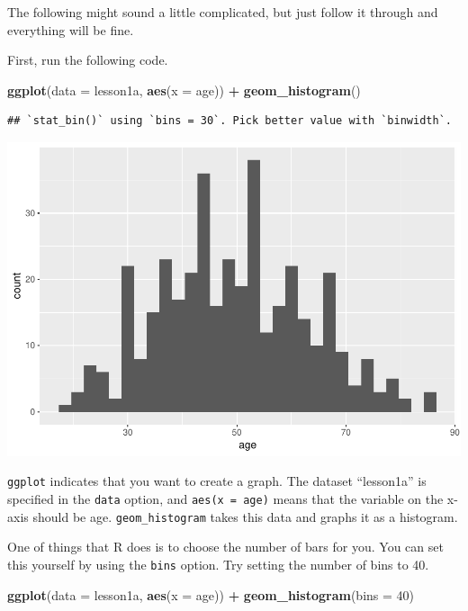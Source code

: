 \documentclass[]{book}
\newenvironment{Shaded}{\begin{snugshade}}{\end{snugshade}}
\newcommand{\DataTypeTok}[1]{\textcolor[rgb]{0.13,0.29,0.53}{#1}}
\newcommand{\DecValTok}[1]{\textcolor[rgb]{0.00,0.00,0.81}{#1}}
\newcommand{\KeywordTok}[1]{\textcolor[rgb]{0.13,0.29,0.53}{\textbf{#1}}}
\newcommand{\NormalTok}[1]{#1}
\newcommand{\OperatorTok}[1]{\textcolor[rgb]{0.81,0.36,0.00}{\textbf{#1}}}
\newcommand{\StringTok}[1]{\textcolor[rgb]{0.31,0.60,0.02}{#1}}
\begin{document}
The following might sound a little complicated, but just follow it
through and everything will be fine.

First, run the following code.

\begin{Shaded}
\begin{Highlighting}[]
\KeywordTok{ggplot}\NormalTok{(}\DataTypeTok{data =}\NormalTok{ lesson1a,}
       \KeywordTok{aes}\NormalTok{(}\DataTypeTok{x =}\NormalTok{ age)) }\OperatorTok{+}
\StringTok{  }\KeywordTok{geom_histogram}\NormalTok{()}
\end{Highlighting}
\end{Shaded}

\begin{verbatim}
## `stat_bin()` using `bins = 30`. Pick better value with `binwidth`.
\end{verbatim}

\includegraphics{02-week2_files/figure-latex/section2m-1.pdf}

\texttt{ggplot} indicates that you want to create a graph. The dataset
``lesson1a'' is specified in the \texttt{data} option, and
\texttt{aes(x\ =\ age)} means that the variable on the x-axis should be
age. \texttt{geom\_histogram} takes this data and graphs it as a
histogram.

One of things that R does is to choose the number of bars for you. You
can set this yourself by using the \texttt{bins} option. Try setting the
number of bins to 40.

\begin{Shaded}
\begin{Highlighting}[]
\KeywordTok{ggplot}\NormalTok{(}\DataTypeTok{data =}\NormalTok{ lesson1a,}
       \KeywordTok{aes}\NormalTok{(}\DataTypeTok{x =}\NormalTok{ age)) }\OperatorTok{+}
\StringTok{  }\KeywordTok{geom_histogram}\NormalTok{(}\DataTypeTok{bins =} \DecValTok{40}\NormalTok{)}
\end{Highlighting}
\end{Shaded}
\end{document}
